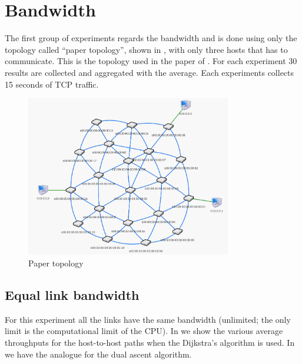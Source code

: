 \section{Bandwidth}\label{sec:bandwidth}

The first group of experiments regards the bandwidth and is done using only the
topology called ``paper topology'', shown in , with only
three hosts that has to communicate. This is the topology used in the paper of
\citeauthor{ilhan-kaplan-dualascent}. For each experiment 30 results are
collected and aggregated with the average. Each experiments collects 15 seconds
of TCP traffic.

\begin{figure}[hbt]
	\centering
	\includegraphics[width=0.8\textwidth]{img/papertopo.png}
	\caption{Paper topology}\label{fig:papertopo}
\end{figure}

\subsection{Equal link bandwidth}

For this experiment all the links have the same bandwidth (unlimited; the only
limit is the computational limit of the CPU). In
 we show the various average throughputs for the
host-to-host paths when the Dijkstra's algorithm is used. In
 we have the analogue for the dual ascent algorithm.

